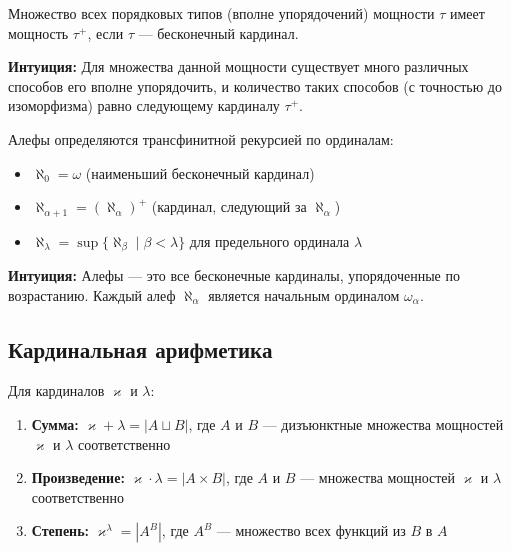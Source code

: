 \documentclass[11pt, a4paper]{extarticle}
\newcommand{\al}{\alpha}
\newcommand{\be}{\beta}
\newcommand{\la}{\lambda}
\newcommand{\ka}{\varkappa}
\begin{document}
\begin{theorem}
Множество всех порядковых типов (вполне упорядочений) мощности $\tau$ имеет мощность $\tau^+$, если $\tau$ --- бесконечный кардинал.

\textbf{Интуиция:} Для множества данной мощности существует много различных способов его вполне упорядочить, и количество таких способов (с точностью до изоморфизма) равно следующему кардиналу $\tau^+$.
\end{theorem}

\begin{definition}[Алефы]
Алефы определяются трансфинитной рекурсией по ординалам:
\begin{itemize}
    \item $\aleph_0 = \omega$ (наименьший бесконечный кардинал)
    \item $\aleph_{\al + 1} = (\aleph_\al)^+$ (кардинал, следующий за $\aleph_\al$)
    \item $\aleph_\la = \sup\{\aleph_\be \mid \be < \la\}$ для предельного ординала $\la$
\end{itemize}

\textbf{Интуиция:} Алефы — это все бесконечные кардиналы, упорядоченные по возрастанию. Каждый алеф $\aleph_\al$ является начальным ординалом $\omega_\al$.
\end{definition}



\subsection{Кардинальная арифметика}

\begin{definition}\;
Для кардиналов $\ka$ и $\la$:
\begin{enumerate}
    \item \textbf{Сумма:} $\ka + \la = |A \sqcup B|$, где $A$ и $B$ --- дизъюнктные множества мощностей $\ka$ и $\la$ соответственно
    \item \textbf{Произведение:} $\ka \cdot \la = |A \times B|$, где $A$ и $B$ --- множества мощностей $\ka$ и $\la$ соответственно
    \item \textbf{Степень:} $\ka^{\la} = |A^B|$, где $A^B$ --- множество всех функций из $B$ в $A$
\end{enumerate}
\end{definition}
\end{document}
